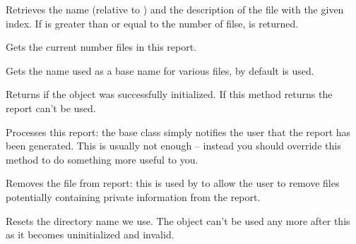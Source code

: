 
Retrieves the name (relative to 
) and the description of the
file with the given index. If  is greater than or equal to the number of
filse, \false is returned.


\label{wxdebugreportgetfilescount}


Gets the current number files in this report.


\label{wxdebugreportgetreportname}


Gets the name used as a base name for various files, by default 
 is used.


\label{wxdebugreportisok}


Returns \true if the object was successfully initialized. If this method returns 
\false the report can't be used.


\label{wxdebugreportprocess}


Processes this report: the base class simply notifies the user that the
report has been generated. This is usually not enough -- instead you
should override this method to do something more useful to you.


\label{wxdebugreportremovefile}


Removes the file from report: this is used by 
 to allow the user to
remove files potentially containing private information from the report.


\label{wxdebugreportreset}


Resets the directory name we use. The object can't be used any more after
this as it becomes uninitialized and invalid.

